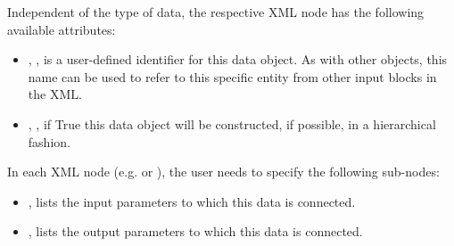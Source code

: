 Independent of the type of data, the respective XML node has the following
available attributes:
\vspace{-5mm}
\begin{itemize}
  \itemsep0em
  \item {}, , is a user-defined
  identifier for this data object.
  \nb As with other objects, this name can be used to refer to this specific
  entity from other input blocks in the XML.

  \item {}, , if True
  this data object will be constructed, if possible, in a hierarchical fashion.
\end{itemize}
\vspace{-5mm}
In each XML node (e.g.  or ), the user
needs to specify the following sub-nodes:
\begin{itemize}
  \item {},  lists
  the input parameters to which this data is connected.
  \item {},  lists
  the output parameters to which this data is connected.
\end{itemize}

